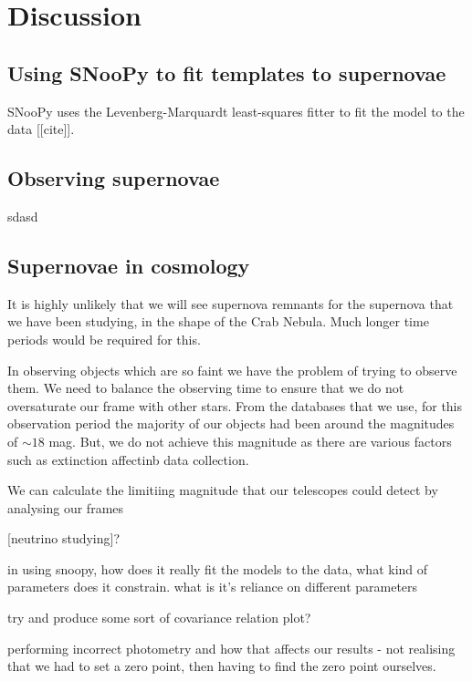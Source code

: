 \documentclass[twocolumn]{revtex4}
\begin{document}
\vspace{-3ex}
\section{Discussion}
\label{discussion}
\vspace{-2ex}

\subsection{Using SNooPy to fit templates to supernovae}
SNooPy uses the Levenberg-Marquardt least-squares fitter to fit the model to the data [[cite]]. 

\subsection{Observing supernovae}
sdasd

\subsection{Supernovae in cosmology}

It is highly unlikely that we will see supernova remnants for the supernova that we have been studying, in the shape of the Crab Nebula. Much longer time periods would be required for this. 

In observing objects which are so faint we have the problem of trying to observe them. We need to balance the observing time to ensure that we do not oversaturate our frame with other stars. From the databases that we use, for this observation period the majority of our objects had been around the magnitudes of $\sim 18$ mag. But, we do not achieve this magnitude as there are various factors such as extinction affectinb data collection. 

We can calculate the limitiing magnitude that our telescopes could detect by analysing our frames

[neutrino studying]?



in using snoopy, how does it really fit the models to the data, what kind of parameters does it constrain. what is it's reliance on different parameters

try and produce some sort of covariance relation plot?

performing incorrect photometry and how that affects our results - not realising that we had to set a zero point, then having to find the zero point ourselves. 
\end{document}
